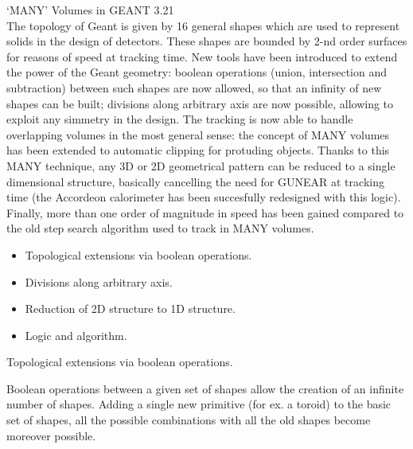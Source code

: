 \oddsidemargin 0.54cm
\evensidemargin 0.0cm
\topmargin -50pt
\textheight 23.5cm 


\pagestyle{plain}
\rm
\Large
`MANY' Volumes in GEANT 3.21  
\\[2em]
\large
\rm
The topology of Geant is given by 16 general shapes which are used to represent
solids in the design of detectors. These shapes are bounded by 2-nd order
surfaces for reasons of speed at tracking time. New tools have been 
introduced to extend the power of the Geant geometry: boolean operations 
(union, intersection and subtraction) between such shapes are now allowed, so
that an infinity of new shapes can be built; divisions along arbitrary axis
are now possible, allowing to exploit any simmetry in the design.
The tracking is now able to handle overlapping volumes in the most general
sense: the concept of MANY volumes has been extended to automatic clipping 
for protuding objects. Thanks to this MANY technique, any 3D or 2D geometrical
pattern can be reduced to a single dimensional structure, basically cancelling
the need for GUNEAR at tracking time (the Accordeon calorimeter has been
succesfully redesigned with this logic). 
Finally, more than one order of magnitude in speed has been gained compared
to the old step search algorithm used to track in MANY volumes. \\[.5cm]
\begin{itemize}
\item Topological extensions via boolean operations.
\item Divisions along arbitrary axis.
\item Reduction of 2D structure to 1D structure.
\item Logic and algorithm.
\end{itemize}  
\begin{center}
Topological extensions via boolean operations.\\[.5cm]
\end{center}
Boolean operations between a given set of shapes allow the creation of an
infinite number of shapes. Adding a single new primitive (for ex. a toroid) to 
the basic set of shapes, all the possible combinations with all the old shapes
become moreover possible.\\[.5cm]
